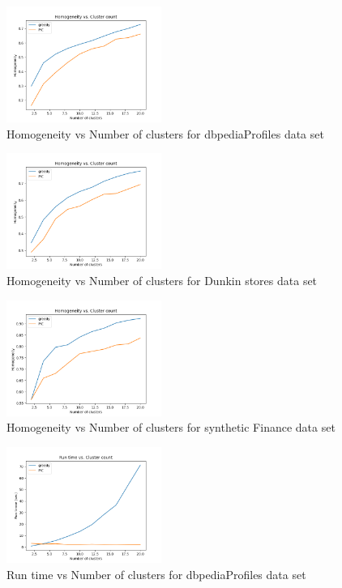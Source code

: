 \begin{figure}[H]
    \centering
    \includegraphics[width=0.45\textwidth]{assets/results/dbpediaProfiles/homogenity_comparison.png}
    \caption{Homogeneity vs Number of clusters for dbpediaProfiles data set}
    \label{fig:homogenity_dbpediaProfiles}
\end{figure}

\begin{figure}[H]
    \centering
    \includegraphics[width=0.45\textwidth]{assets/results/dunkin_stores/homogenity_comparison.png}
    \caption{Homogeneity vs Number of clusters for Dunkin stores data set}
    \label{fig:homogenity_dunkin_stores}
\end{figure}

\begin{figure}[H]
    \centering
    \includegraphics[width=0.45\textwidth]{assets/results/syntheticFincances/homogenity_comparison.png}
    \caption{Homogeneity vs Number of clusters for synthetic Finance data set}
    \label{fig:homogenity_syntheticFinance}
\end{figure}

\begin{figure}[H]
    \centering
    \includegraphics[width=0.45\textwidth]{assets/results/dbpediaProfiles/run_time_comparison.png}
    \caption{Run time vs Number of clusters for dbpediaProfiles data set}
    \label{fig:runtime_dbpediaProfiles}
\end{figure}

